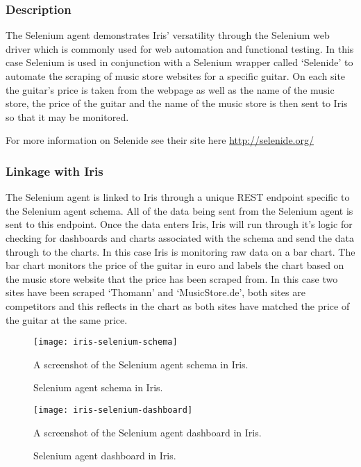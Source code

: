 \documentclass[12pt,a4paper,titlepage]{report}
\begin{document}
\subsubsection{Description}
The Selenium agent demonstrates Iris' versatility through the Selenium web driver which is commonly used for web automation and functional testing. In this case Selenium is used in conjunction with a Selenium wrapper called `Selenide' to automate the scraping of music store websites for a specific guitar. On each site the guitar's price is taken from the webpage as well as the name of the music store, the price of the guitar and the name of the music store is then sent to Iris so that it may be monitored.

For more information on Selenide see their site here \url{http://selenide.org/}

\subsubsection{Linkage with Iris}
The Selenium agent is linked to Iris through a unique REST endpoint specific to the Selenium agent schema. All of the data being sent from the Selenium agent is sent to this endpoint. Once the data enters Iris, Iris will run through it's logic for checking for dashboards and charts associated with the schema and send the data through to the charts. 
In this case Iris is monitoring raw data on a bar chart. The bar chart monitors the price of the guitar in euro and labels the chart based on the music store website that the price has been scraped from. In this case two sites have been scraped `Thomann' and `MusicStore.de', both sites are competitors and this reflects in the chart as both sites have matched the price of the guitar at the same price.

\begin{figure}[H]
\begin{tcolorbox}
\begin{center}
\texttt{[image: iris-selenium-schema]}
\end{center}
A screenshot of the Selenium agent schema in Iris.
\end{tcolorbox}
\caption{Selenium agent schema in Iris.}
\end{figure}

\begin{figure}[H]
\begin{tcolorbox}
\begin{center}
\texttt{[image: iris-selenium-dashboard]}
\end{center}
A screenshot of the Selenium agent dashboard in Iris.
\end{tcolorbox}
\caption{Selenium agent dashboard in Iris.}
\end{figure}
\end{document}
